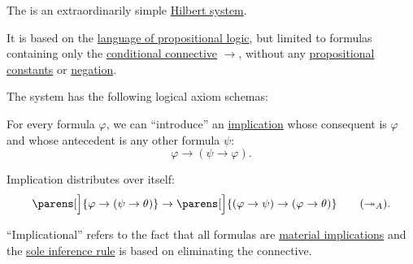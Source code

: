 \begin{definition}\label{def:implicational_propositional_hilbert_system}
  The  is an extraordinarily simple \hyperref[def:axiomatic_deductive_system]{Hilbert system}.

  It is based on the \hyperref[def:propositional_language]{language of propositional logic}, but limited to formulas containing only the \hyperref[def:propositional_language/connectives/conditional]{conditional connective} \( \rightarrow \), without any \hyperref[def:propositional_language/constants]{propositional constants} or \hyperref[def:propositional_language/negation]{negation}.

  The system has the following logical axiom schemas:
  \begin{thmenum}
     For every formula \( \varphi \), we can \enquote{introduce} an \hyperref[def:material_implication]{implication} whose consequent is \( \varphi \) and whose antecedent is any other formula \( \psi \):
    \begin{equation}\label{eq:def:implicational_propositional_hilbert_system/intro}
      \varphi \rightarrow (\psi \rightarrow \varphi) \tag{\( \rightarrow_A^+ \)}.
    \end{equation}

     Implication distributes over itself:
    \begin{equation}\label{eq:def:implicational_propositional_hilbert_system/trans}
      \parens[\Big]{ \varphi \rightarrow (\psi \rightarrow \theta) } \rightarrow \parens[\Big]{ (\varphi \rightarrow \psi) \rightarrow (\varphi \rightarrow \theta)} \tag{\( \twoheadrightarrow_A \)}.
    \end{equation}
  \end{thmenum}
\end{definition}
\begin{comments}
  \item \enquote{Implicational} refers to the fact that all formulas are \hyperref[def:material_implication]{material implications} and the \hyperref[eq:def:def:axiomatic_deductive_system/mp]{sole inference rule} is based on eliminating the connective.
\end{comments}

